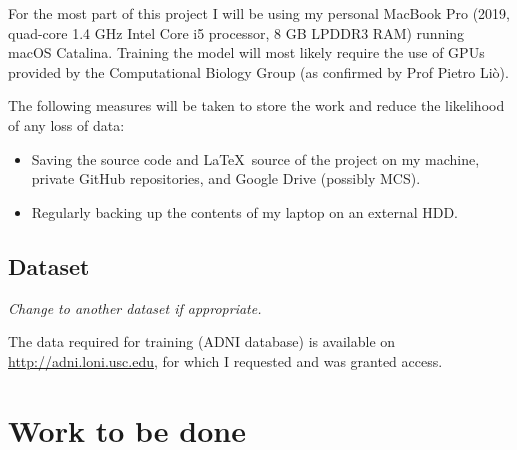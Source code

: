 \documentclass[12pt,a4paper,twoside]{article}
\begin{document}
For the most part of this project I will be using my personal MacBook Pro (2019, quad-core 1.4 GHz Intel Core i5 processor, 8 GB LPDDR3 RAM) running macOS Catalina. Training the model will most likely require the use of GPUs provided by the Computational Biology Group (as confirmed by Prof Pietro Liò).

The following measures will be taken to store the work and reduce the likelihood of any loss of data: 
\begin{itemize}
  \item Saving the source code and \LaTeX\ source of the project on my machine, private GitHub repositories, and Google Drive (possibly MCS).
  \item Regularly backing up the contents of my laptop on an external HDD.
\end{itemize}

\subsection*{Dataset}
\textit{Change to another dataset if appropriate.}

The data required for training (ADNI database) is available on \url{http://adni.loni.usc.edu}, for which I requested and was granted access.

\section*{Work to be done}
\label{section:work}
\end{document}

